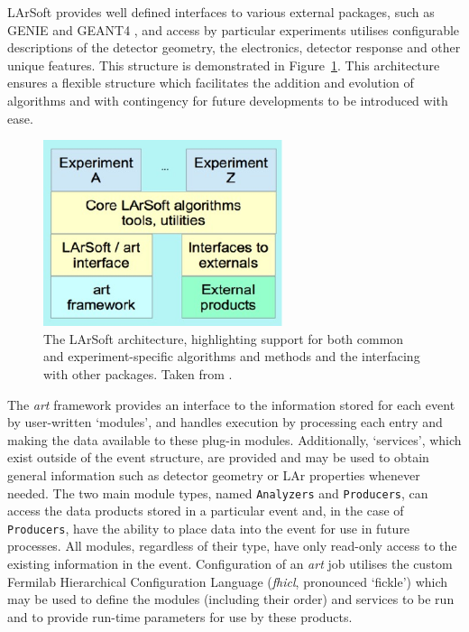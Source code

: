 LArSoft provides well defined interfaces to various external packages, such as GENIE \cite{GENIE2010} and GEANT4 \cite{GEANT42006}, and access by particular experiments utilises configurable descriptions of the detector geometry, the electronics, detector response and other unique features.  This structure is demonstrated in Figure~\ref{fig:LArSoftStructure}.  This architecture ensures a flexible structure which facilitates the addition and evolution of algorithms and with contingency for future developments to be introduced with ease.

\begin{figure}
  \centering
  \includegraphics[width=7cm]{LArSoftStructure.pdf}
  \caption[The LArSoft architecture, highlighting support for both common and experiment-specific algorithms and methods and the interfacing with other packages.]{The LArSoft architecture, highlighting support for both common and experiment-specific algorithms and methods and the interfacing with other packages.  Taken from \cite{LArSoft2016}.}
  \label{fig:LArSoftStructure}
\end{figure}

The \textit{art} framework provides an interface to the information stored for each event by user-written `modules', and handles execution by processing each entry and making the data available to these plug-in modules.  Additionally, `services', which exist outside of the event structure, are provided and may be used to obtain general information such as detector geometry or LAr properties whenever needed.  The two main module types, named \texttt{Analyzers} and \texttt{Producers}, can access the data products stored in a particular event and, in the case of \texttt{Producers}, have the ability to place data into the event for use in future processes.  All modules, regardless of their type, have only read-only access to the existing information in the event.  Configuration of an \textit{art} job utilises the custom Fermilab Hierarchical Configuration Language (\textit{fhicl}, pronounced `fickle') which may be used to define the modules (including their order) and services to be run and to provide run-time parameters for use by these products.

